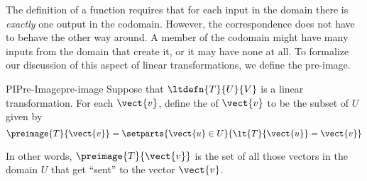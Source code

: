 %
%
The definition of a function requires that for each input in the domain there is {\em exactly} one output in the codomain.  However, the correspondence does not have to behave the other way around.  A member of the codomain might have many inputs from the domain that create it, or it may have none at all.  To formalize our discussion of this aspect of linear transformations, we define the pre-image.
%
\begin{definition}{PI}{Pre-Image}{pre-image}
Suppose that $\ltdefn{T}{U}{V}$ is a linear transformation.  For each $\vect{v}$, define the  of $\vect{v}$ to be the subset of $U$ given by
%
\begin{equation*}
\preimage{T}{\vect{v}}=\setparts{\vect{u}\in U}{\lt{T}{\vect{u}}=\vect{v}}
\end{equation*}
%
\end{definition}
%
In other words, $\preimage{T}{\vect{v}}$ is the set of all those vectors in the domain $U$ that get ``sent'' to the vector $\vect{v}$.\par
%
%
%
